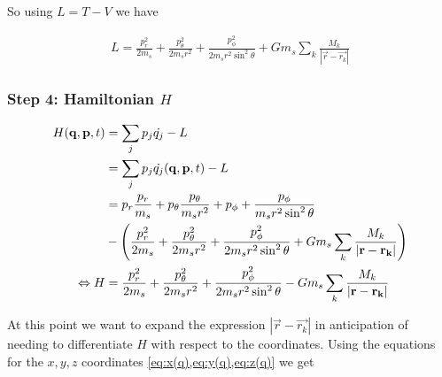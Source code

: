 So using \(L = T - V\) we have

\begin{align}
    L = \frac{p_r^2}{2 m_s} + \frac{p_\theta^2}{2 m_s r^2} + \frac{p_\phi^2}{2 m_s r^2 \sin^2{\theta}} + G m_s \sum\limits_{k} \frac{M_k}{\left| \vec{r} - \vec{r_k} \right|}
\end{align}

\subsubsection{Step 4: Hamiltonian \(H\)}
\begin{align}
    H(\vec{q}, \vec{p}, t) &= \sum\limits_{j}p_j \dot{q_j} - L \\
    &= \sum\limits_{j}p_j \dot{q_j}(\vec{q}, \vec{p}, t) - L \\
    &= p_r \frac{p_r}{m_s} + p_\theta \frac{p_\theta}{m_s r^2} + p_\phi + \frac{p_\phi}{m_s r^2 \sin^2{\theta}} \notag \\
    &- \left( \frac{p_r^2}{2 m_s} + \frac{p_\theta^2}{2 m_s r^2} + \frac{p_\phi^2}{2 m_s r^2 \sin^2{\theta}} + G m_s \sum\limits_{k} \frac{M_k}{\left| \vec{r} - \vec{r_k} \right|} \right) \\
    \Leftrightarrow H &= \frac{p_r^2}{2 m_s} + \frac{p_\theta^2}{2 m_s r^2} + \frac{p_\phi^2}{2 m_s r^2 \sin^2{\theta}} - G m_s \sum\limits_{k} \frac{M_k}{\left| \vec{r} - \vec{r_k} \right|}
\end{align}

At this point we want to expand the expression \(\left| \vec{r} - \vec{r_k} \right|\) in anticipation of needing to differentiate \(H\) with respect to the coordinates. Using the equations for the \(x, y, z\) coordinates \cref{eq:x(q),eq:y(q),eq:z(q)} we get

